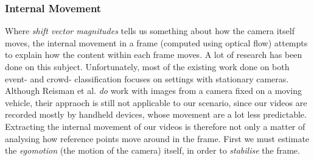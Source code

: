\subsubsection{Internal Movement}\label{sec:opticalflowdata}
%
Where \textit{shift vector magnitudes} tells us something about how the camera itself moves, the internal movement in a frame (computed using optical flow) attempts to explain how the content within each frame moves. A lot of research has been done on this subject. Unfortunately, most of the existing work done on both event- and crowd- classification focuses on settings with stationary cameras. Although Reisman et al. \cite{CrowdDetectionInVideoSequences} \textit{do} work with images from a camera fixed on a moving vehicle, their appraoch is still not applicable to our scenario, since our videos are recorded mostly by handheld devices, whose movement are a lot less predictable. Extracting the internal movement of our videos is therefore not only a matter of analysing how reference points move around in the frame. First we must estimate the \textit{egomotion} (the motion of the camera) itself, in order to \textit{stabilise} the frame.
%
